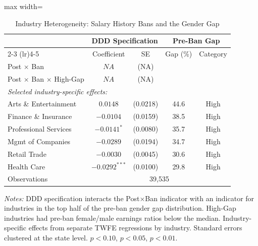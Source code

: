 \begin{table}[htbp]
\centering
\caption{Industry Heterogeneity: Salary History Bans and the Gender Gap}
\label{tab:industry}
\begin{threeparttable}
\begin{adjustbox}{max width=\textwidth}
\begin{tabular}{lcccc}
\toprule
 & \multicolumn{2}{c}{DDD Specification} & \multicolumn{2}{c}{Pre-Ban Gap} \\
\cmidrule(lr){2-3} \cmidrule(lr){4-5}
 & Coefficient & SE & Gap (\%) & Category \\
\midrule
Post $\times$ Ban & $NA$ & (NA) & & \\
Post $\times$ Ban $\times$ High-Gap & $NA$ & (NA) & & \\
\midrule
\multicolumn{5}{l}{\textit{Selected industry-specific effects:}} \\
\quad Arts \& Entertainment & $0.0148$ & (0.0218) & 44.6 & High \\
\quad Finance \& Insurance & $-0.0104$ & (0.0159) & 38.5 & High \\
\quad Professional Services & $-0.0141^{*}$ & (0.0080) & 35.7 & High \\
\quad Mgmt of Companies & $-0.0289$ & (0.0194) & 34.7 & High \\
\quad Retail Trade & $-0.0030$ & (0.0045) & 30.6 & High \\
\quad Health Care & $-0.0292^{***}$ & (0.0100) & 29.8 & High \\
\midrule
Observations & \multicolumn{4}{c}{39,535} \\
\bottomrule
\end{tabular}
\end{adjustbox}
\begin{tablenotes}[flushleft]
\small
\item \textit{Notes:} DDD specification interacts the Post$\times$Ban indicator with an
indicator for industries in the top half of the pre-ban gender gap distribution.
High-Gap industries had pre-ban female/male earnings ratios below the median.
Industry-specific effects from separate TWFE regressions by industry.
Standard errors clustered at the state level.
\sym{*} $p<0.10$, \sym{**} $p<0.05$, \sym{***} $p<0.01$.
\end{tablenotes}
\end{threeparttable}
\end{table}
